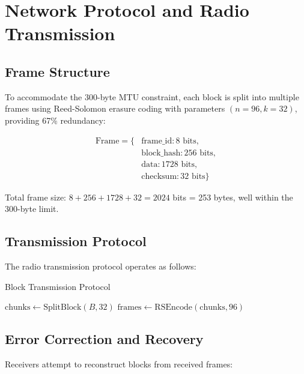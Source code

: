 \documentclass[11pt,a4paper]{article}
\begin{document}
\section{Network Protocol and Radio Transmission}

\subsection{Frame Structure}

To accommodate the 300-byte MTU constraint, each block is split into multiple frames using Reed-Solomon erasure coding with parameters $(n=96, k=32)$, providing 67\% redundancy:

\begin{align}
\text{Frame} = \{&\text{frame\_id}: 8 \text{ bits},\\
&\text{block\_hash}: 256 \text{ bits},\\
&\text{data}: 1728 \text{ bits},\\
&\text{checksum}: 32 \text{ bits}\}
\end{align}

Total frame size: $8 + 256 + 1728 + 32 = 2024$ bits = 253 bytes, well within the 300-byte limit.

\subsection{Transmission Protocol}

The radio transmission protocol operates as follows:

\begin{algorithm}[H]
\SetAlgoLined
{}
\caption{Block Transmission Protocol}

$\text{chunks} \leftarrow \text{SplitBlock}(B, 32)$\;
$\text{frames} \leftarrow \text{RSEncode}(\text{chunks}, 96)$\;

\end{algorithm}

\subsection{Error Correction and Recovery}

Receivers attempt to reconstruct blocks from received frames:
\end{document}
